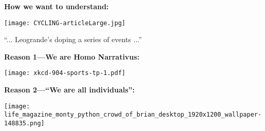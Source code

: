   \textbf{How we want to understand:}


  \begin{center}
  \texttt{[image: CYCLING-articleLarge.jpg]}
  \end{center}

  
  
    ``... Leogrande's doping  a series of events ...''
  







  \textbf{Reason 1---We are Homo Narrativus:}


  \begin{center}
    \texttt{[image: xkcd-904-sports-tp-1.pdf]}\\
  \end{center}

  \small





  \textbf{Reason 2---``We are all individuals'':}

  \texttt{[image: life\_magazine\_monty\_python\_crowd\_of\_brian\_desktop\_1920x1200\_wallpaper-148835.png]}


